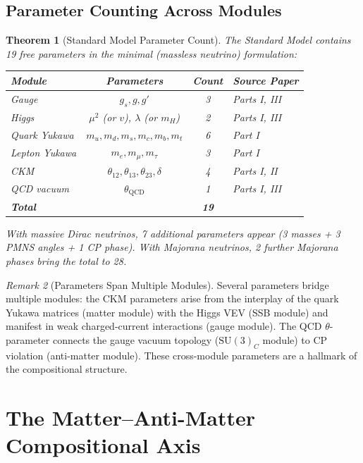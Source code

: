 \documentclass[12pt]{article}
\newtheorem{theorem}{Theorem}[section]
\theoremstyle{definition}
\theoremstyle{remark}
\newtheorem{remark}[theorem]{Remark}
\newcommand{\su}[1]{\mathrm{SU}(#1)}
\begin{document}
\subsection{Parameter Counting Across Modules}

\begin{theorem}[Standard Model Parameter Count]
\label{thm:parameter-count}
The Standard Model contains 19 free parameters in the minimal (massless neutrino) formulation:
\begin{center}
\renewcommand{\arraystretch}{1.2}
\begin{tabular}{lccl}
\toprule
\textbf{Module} & \textbf{Parameters} & \textbf{Count} & \textbf{Source Paper} \\
\midrule
Gauge & $g_s, g, g'$ & 3 & Parts I, III \\
Higgs & $\mu^2$ (or $v$), $\lambda$ (or $m_H$) & 2 & Parts I, III \\
Quark Yukawa & $m_u, m_d, m_s, m_c, m_b, m_t$ & 6 & Part I \\
Lepton Yukawa & $m_e, m_\mu, m_\tau$ & 3 & Part I \\
CKM & $\theta_{12}, \theta_{13}, \theta_{23}, \delta$ & 4 & Parts I, II \\
QCD vacuum & $\theta_{\mathrm{QCD}}$ & 1 & Parts I, III \\
\midrule
\textbf{Total} & & \textbf{19} & \\
\bottomrule
\end{tabular}
\end{center}
With massive Dirac neutrinos, 7 additional parameters appear (3 masses + 3 PMNS angles + 1 CP phase). With Majorana neutrinos, 2 further Majorana phases bring the total to 28.
\end{theorem}

\begin{remark}[Parameters Span Multiple Modules]
Several parameters bridge multiple modules: the CKM parameters arise from the interplay of the quark Yukawa matrices (matter module) with the Higgs VEV (SSB module) and manifest in weak charged-current interactions (gauge module). The QCD $\theta$-parameter connects the gauge vacuum topology ($\su{3}_C$ module) to CP violation (anti-matter module). These cross-module parameters are a hallmark of the compositional structure.
\end{remark}


\section{The Matter--Anti-Matter Compositional Axis}
\label{sec:matter-antimatter}
\end{document}
